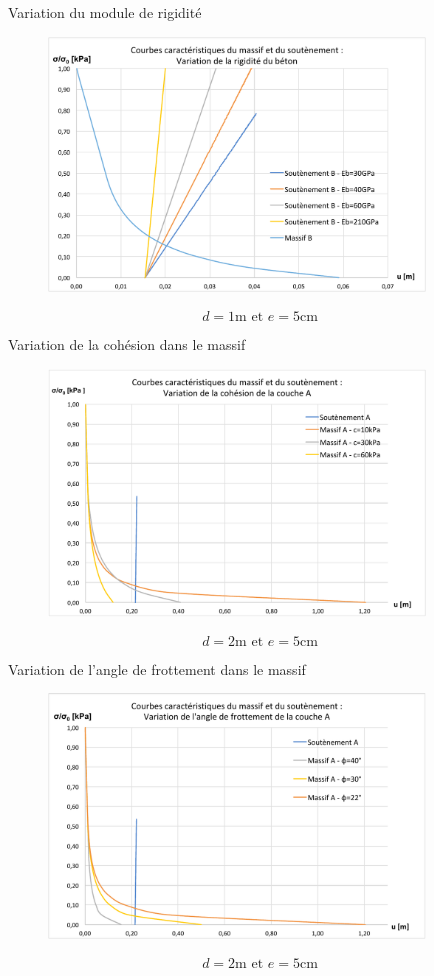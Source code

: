 \documentclass{beamer}
\begin{document}
\begin{frame}{Variation du module de rigidité}

\begin{figure}
\centering
\includegraphics[width=10cm]{var_EbB.pdf}
\end{figure}
\[d=1\text{m et }e=5\text{cm}\]
\end{frame}

\begin{frame}{Variation de la cohésion dans le massif}
\begin{figure}
\centering
\includegraphics[width=10cm]{var_cA.pdf}
\end{figure}
\[d=2\text{m et }e=5\text{cm}\]
\end{frame}

\begin{frame}{Variation de l'angle de frottement dans le massif}
\begin{figure}
\centering
\includegraphics[width=10cm]{phi_A.pdf}
\end{figure}
\[d=2\text{m et }e=5\text{cm}\]    
\end{frame}
\end{document}
